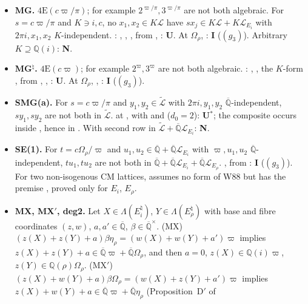 \documentclass[11pt]{amsart}
\theoremstyle{definition}
\theoremstyle{remark}
\numberwithin{equation}{section}
\newcommand{\QQ}{\mathbb{Q}}
\newcommand{\Qbar}{\overline{\mathbb{Q}}}
\newcommand{\vp}{\varpi}
\begin{document}
\begin{itemize}
\item \textbf{MG.} $\mathrm{4E}(c\vp/\pi)$; for example $2^{\vp/\pi},3^{\vp/\pi}$ are not both algebraic. For $s=c\vp/\pi$ and
$K\ni i,c$, no $x_1,x_2\in K\mathcal L$ have $sx_j\in K\mathcal L+K\mathcal L_{E_i}$ with $2\pi i,x_1,x_2$ $K$-independent.
: , , , from ,
: \textbf{U}. At $\Omega_\rho$, : \textbf{I} ($(g_3)$). Arbitrary
$K\supseteq\QQ(i)$: \textbf{N}.
\item \textbf{MG$^\natural$.} $\mathrm{4E}(c\vp)$; for example $2^{\vp},3^{\vp}$ are not both algebraic. :
, , the $K$-form , from ,
, : \textbf{U}. At $\Omega_\rho$, ,
: \textbf{I} ($(g_3)$).
\item \textbf{SMG(a).} For $s=c\vp/\pi$ and $y_1,y_2\in\widetilde{\mathcal L}$ with $2\pi i,y_1,y_2$ $\Qbar$-independent, $sy_1,sy_2$
are not both in $\widetilde{\mathcal L}$.  at , with  and
 ($d_0=2$): \textbf{U}$^*$; the composite occurs inside , hence in
. With second row in $\widetilde{\mathcal L}+\Qbar\mathcal L_{E_i}$: \textbf{N}.
\item \textbf{SE(1).} For $t=c\Omega_\rho/\vp$ and $u_1,u_2\in\Qbar+\Qbar\mathcal L_{E_i}$ with $\vp,u_1,u_2$ $\Qbar$-independent,
$tu_1,tu_2$ are not both in $\Qbar+\Qbar\mathcal L_{E_i}+\Qbar\mathcal L_{E_\rho}$. , from
: \textbf{I} ($(g_3)$). For two non-isogenous CM lattices,  assumes no
form of W88 but has the premise , proved only for $E_i$, $E_\rho$.
\item \textbf{MX, MX$'$, deg2.} Let $X\in\Lambda(E_i^\natural)$, $Y\in\Lambda(E_\rho^\natural)$ with base and fibre coordinates $(z,w)$,
$a,a'\in\Qbar$, $\beta\in\Qbar^\times$. (MX) $(z(X)+z(Y)+a)\beta\eta_\rho=(w(X)+w(Y)+a')\vp$ implies
$z(X)+z(Y)+a\in\Qbar\vp+\Qbar\Omega_\rho$, and then $a=0$, $z(X)\in\QQ(i)\vp$, $z(Y)\in\QQ(\rho)\Omega_\rho$. (MX$'$)
$(z(X)+w(Y)+a)\beta\Omega_\rho=(w(X)+z(Y)+a')\vp$ implies $z(X)+w(Y)+a\in\Qbar\vp+\Qbar\eta_\rho$ (Proposition~D$'$ of

\end{itemize}
\end{document}
